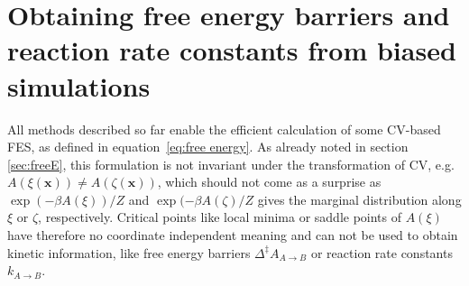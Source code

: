 \section{Obtaining free energy barriers and reaction rate constants from biased simulations}
\label{sec:A_geom}
All methods described so far enable the efficient calculation of some CV-based FES, as defined in equation~\ref{eq:free energy}.
As already noted in section \ref{sec:freeE}, this formulation is not invariant under the transformation of CV, e.g. $A(\xi(\textbf{x}))\neq A(\zeta(\textbf{x}))$, which should not come as a surprise as $\exp(-\beta A(\xi))/Z$ and $\exp(-\beta A({\zeta})/Z$ gives the marginal distribution along $\xi$ or $\zeta$, respectively.
Critical points like local minima or saddle points of $A(\xi)$ have therefore no coordinate independent meaning and can not be used to obtain kinetic information, like free energy barriers $\Delta^\ddagger A_{A\rightarrow B}$ or reaction rate constants $k_{A\rightarrow B}$.\autocite{bal2020free}

